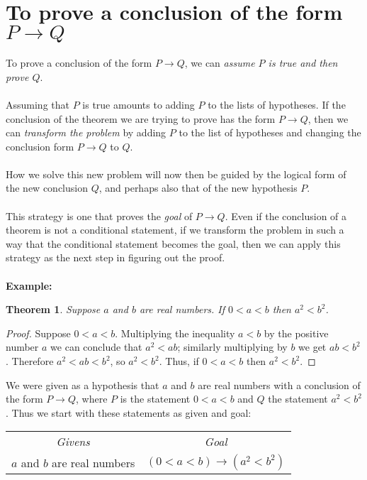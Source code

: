 \documentclass{report}
\newtheorem*{theorem}{Theorem}
\theoremstyle{definition}
\begin{document}
\section{To prove a conclusion of the form $P\to Q$}
To prove a conclusion of the form $P\to Q$, we can \textit{assume $P$ is true and then prove $Q$}.\\
\vspace{1mm}\\
Assuming that $P$ is true amounts to adding $P$ to the lists of hypotheses. If the conclusion of the theorem we are trying to prove has the form $P\to Q$, then we can \textit{transform the
problem} by adding $P$ to the list of hypotheses and changing the conclusion form $P\to Q$ to $Q$.\\
\vspace{1mm}\\
How we solve this new problem will now then be guided by the logical form of the new conclusion $Q$, and perhaps also that of the new hypothesis $P$.\\
\vspace{1mm}\\
This strategy is one that proves the \textit{goal} of $P\to Q$. Even if the conclusion of a theorem is not a conditional statement, if we transform the problem in such a way that the conditional
statement becomes the goal, then we can apply this strategy as the next step in figuring out the proof.\\
\vspace{1mm}\\
\textbf{Example:}
\begin{theorem}
Suppose $a$ and $b$ are real numbers. If $0<a<b$ then $a^2<b^2$.
\end{theorem}
\begin{proof}
Suppose $0<a<b$. Multiplying the inequality $a<b$ by the positive number $a$ we can conclude that $a^2<ab$; similarly multiplying by $b$ we get $ab<b^2$. Therefore $a^2<ab<b^2$, so $a^2<b^2$. Thus, if $0<a<b$ then $a^2<b^2$.
\end{proof}
\noindent We were given as a hypothesis that $a$ and $b$ are real numbers with a conclusion of the form $P\to Q$, where $P$ is the statement $0<a<b$ and $Q$ the statement $a^2<b^2$. Thus
we start with these statements as given and goal:
\begin{center}
\begin{tabular}{c|c}
\textit{Givens}&\textit{Goal}\\
$a$ and $b$ are real numbers&$(0<a<b)\to(a^2<b^2)$
\end{tabular}
\end{center}
\end{document}
